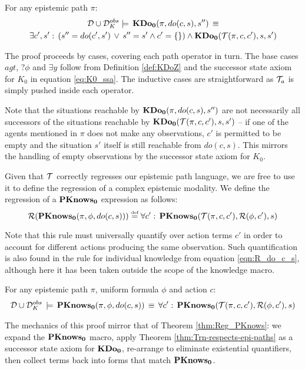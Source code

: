 \begin{thm}
\label{thm:Trn-respects-epi-paths}For any epistemic path $\pi$:\begin{multline*}
\mathcal{D}\cup\mathcal{D}_{K}^{obs}\models\,\mathbf{KDo_{0}}(\pi,do(c,s),s'')\,\equiv\\
\exists c',s':\,\left(s''=do(c',s')\,\vee\, s''=s'\wedge c'=\{\}\right)\wedge\mathbf{KDo_{0}}(\mathcal{T}(\pi,c,c'),s,s')\end{multline*}

\end{thm}
\begin{proofsketch}
The proof proceeds by cases, covering each path operator in turn.
The base cases $agt$, $?\phi$ and $\exists y$ follow from Definition
\ref{def:KDoZ} and the successor state axiom for $K_{0}$ in equation
\eqref{eq:K0_ssa}. The inductive cases are straightforward as $\mathcal{T}_{a}$
is simply pushed inside each operator. 
\end{proofsketch}
Note that the situations reachable by $\mathbf{KDo_{0}}(\pi,do(c,s),s'')$ are
not necessarily all successors of the situations reachable by $\mathbf{KDo_{0}}(\mathcal{T}(\pi,c,c'),s,s')$
-- if one of the agents mentioned in $\pi$ does not make any observations,
$c'$ is permitted to be empty and the situation $s'$ itself is still
reachable from $do(c,s)$. This mirrors the handling of empty observations
by the successor state axiom for $K_{0}$.

Given that $\mathcal{T}$ correctly regresses our epistemic path language,
we are free to use it to define the regression of a complex epistemic
modality. We define the regression of a $\mathbf{PKnows_{0}}$ expression as
follows:\[
\mathcal{R}(\mathbf{PKnows_{0}}(\pi,\phi,do(c,s)))\stackrel{\mbox{\tiny def}}{=}\forall c':\,\mathbf{PKnows_{0}}(\mathcal{T}(\pi,c,c'),\mathcal{R}(\phi,c'),s)\]


Note that this rule must universally quantify over action terms $c'$
in order to account for different actions producing the same observation.
Such quantification is also found in the rule for individual knowledge
from equation \eqref{eqn:R_do_c_s}, although here it has been taken
outside the scope of the knowledge macro.

\begin{thm}
\label{thm:Reg_PKnowsZ}For any epistemic path $\pi$, uniform formula
$\phi$ and action $c$:\begin{gather*}
\mathcal{D}\cup\mathcal{D}_{K}^{obs}\,\models\,\mathbf{PKnows_{0}}(\pi,\phi,do(c,s))\,\equiv\,\forall c':\,\mathbf{PKnows_{0}}(\mathcal{T}(\pi,c,c'),\mathcal{R}(\phi,c'),s)\end{gather*}

\end{thm}
\begin{proofsketch}
The mechanics of this proof mirror that of Theorem \ref{thm:Reg_PKnows}:
we expand the $\mathbf{PKnows_{0}}$ macro, apply Theorem \ref{thm:Trn-respects-epi-paths}
as a successor state axiom for $\mathbf{KDo_{0}}$, re-arrange to eliminate existential
quantifiers, then collect terms back into forms that match $\mathbf{PKnows_{0}}$. 
\end{proofsketch}

